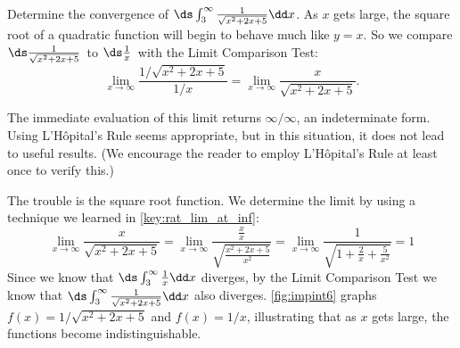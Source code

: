 \begin{example}\label{ex_impint6}
Determine the convergence of $\ds \int_3^{\infty} \frac{1}{\sqrt{x^2+2x+5}}\dd x$.
\solution
As $x$ gets large, the square root of a quadratic function will begin to behave much like $y=x$. So we compare \small$\ds\frac{1}{\sqrt{x^2+2x+5}}$\normalsize\ to \small$\ds\frac1x$\normalsize\ with the Limit Comparison Test:
\[
\lim_{x\to\infty} \frac{1/\sqrt{x^2+2x+5}}{1/x}
= \lim_{x\to\infty}\frac{x}{\sqrt{x^2+2x+5}}.
\]

The immediate evaluation of this limit returns $\infty/\infty$, an indeterminate form. Using L'Hôpital's Rule seems appropriate, but in this situation, it does not lead to useful results. (We encourage the reader to employ L'Hôpital's Rule at least once to verify this.)

The trouble is the square root function.
We determine the limit by using a technique we learned in \autoref{key:rat_lim_at_inf}:
%
%
\[
 \lim_{x\to\infty}\frac x{\sqrt{x^2+2x+5}}
 =\lim_{x\to\infty}\frac{\frac xx}{\sqrt{\frac{x^2+2x+5}{x^2}}}
 =\lim_{x\to\infty}\frac1{\sqrt{1+\frac2x+\frac5{x^2}}}=1
\]
Since we know that $\ds\int_3^{\infty} \tfrac1x\dd x$ diverges, by the Limit Comparison Test we know that $\ds\int_3^\infty\tfrac1{\sqrt{x^2+2x+5}}\dd x$ also diverges. \autoref{fig:impint6} graphs $f(x)=1/\sqrt{x^2+2x+5}$ and $f(x)=1/x$, illustrating that as $x$ gets large, the functions become indistinguishable.
\end{example}

